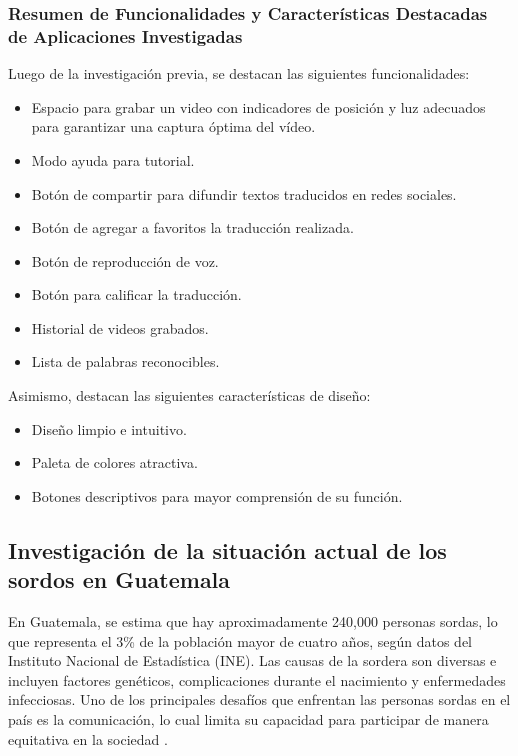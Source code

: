 \subsubsection{Resumen de Funcionalidades y Características Destacadas de Aplicaciones Investigadas}

Luego de la investigación previa, se destacan las siguientes funcionalidades:
\begin{itemize}
    \item Espacio para grabar un video con indicadores de posición y luz adecuados para garantizar una captura óptima del vídeo.
    \item Modo ayuda para tutorial.
    \item Botón de compartir para difundir textos traducidos en redes sociales.
    \item Botón de agregar a favoritos la traducción realizada.
    \item Botón de reproducción de voz.
    \item Botón para calificar la traducción.
    \item Historial de videos grabados.
    \item Lista de palabras reconocibles.
\end{itemize}

Asimismo, destacan las siguientes características de diseño:
\begin{itemize}
    \item Diseño limpio e intuitivo.
    \item Paleta de colores atractiva.
    \item Botones descriptivos para mayor comprensión de su función.
\end{itemize}


\subsection{Investigación de la situación actual de los sordos en Guatemala}

En Guatemala, se estima que hay aproximadamente 240,000 personas sordas, lo que representa el 3\% de la población mayor de cuatro años, según datos del Instituto Nacional de Estadística (INE). Las causas de la sordera son diversas e incluyen factores genéticos, complicaciones durante el nacimiento y enfermedades infecciosas. Uno de los principales desafíos que enfrentan las personas sordas en el país es la comunicación, lo cual limita su capacidad para participar de manera equitativa en la sociedad \cite{CongresoGuatemala} \cite{GobiernoGuatemala2022}.

